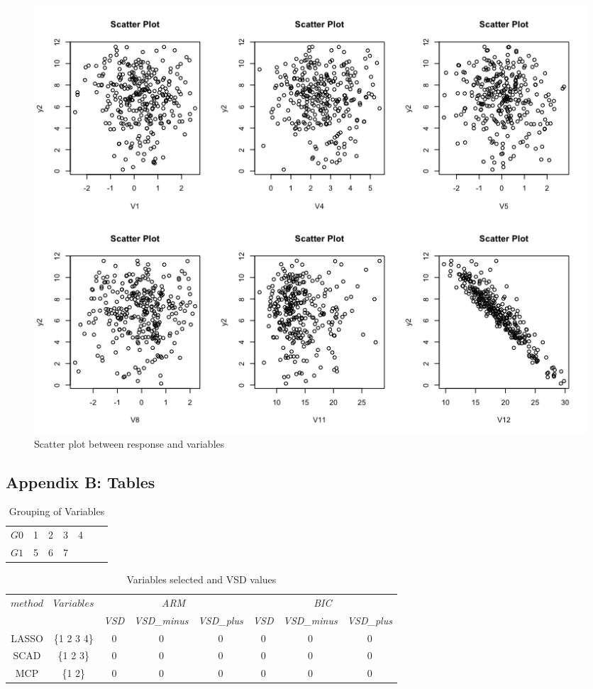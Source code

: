 \documentclass[11pt a4paper]{article}
\begin{document}
\begin{figure}[H]
	\centering
	\includegraphics[scale=0.45]{scatter1.png}
	\caption{Scatter plot between response and variables}
	\label{fig:scatter1}
\end{figure}




\subsection*{Appendix B: Tables}

\begin{table}[H]
	\centering
	\caption{Grouping of Variables}
	\begin{tabular}{c|cccccc}
		\hline
		$G0$ & 1 & 2 & 3 & 4  \\
		$G1$ & 5 & 6 & 7 &   \\
		\hline
	\end{tabular}
	\label{table:var-group}
\end{table}

\begin{table}[H]
	\centering
	\caption{Variables selected and VSD values}
	\begin{tabular}{c|ccccccc}
		\hline
		\multirow{2}{*}{$method$} & \multirow{2}{*}{$Variables$} & \multicolumn{3}{c}{\textsl{ARM}} & \multicolumn{3}{c}{\textsl{BIC}} \\
		\cline{3-8}
		& \textsl{} & \textsl{VSD} & \textsl{VSD\_minus} & \textsl{VSD\_plus} & \textsl{VSD} & \textsl{VSD\_minus} & \textsl{VSD\_plus} \\
		\hline
		LASSO & \{1 2 3 4\} & 0 & 0 & 0  & 0 & 0 & 0  \\
		SCAD & \{1 2 3\} & 0 & 0 & 0  & 0 & 0 & 0 \\
		MCP & \{1 2\} & 0 & 0 & 0  & 0 & 0 & 0 \\
		\hline
	\end{tabular}
	\label{table:vsd}
\end{table}
\end{document}
